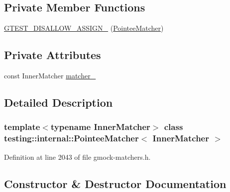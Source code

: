 \subsection*{Private Member Functions}
\begin{DoxyCompactItemize}
\item 
\hyperlink{classtesting_1_1internal_1_1PointeeMatcher_a9e564aa0569377a404edefb7b2ccdb16}{G\+T\+E\+S\+T\+\_\+\+D\+I\+S\+A\+L\+L\+O\+W\+\_\+\+A\+S\+S\+I\+G\+N\+\_\+} (\hyperlink{classtesting_1_1internal_1_1PointeeMatcher}{Pointee\+Matcher})
\end{DoxyCompactItemize}
\subsection*{Private Attributes}
\begin{DoxyCompactItemize}
\item 
const Inner\+Matcher \hyperlink{classtesting_1_1internal_1_1PointeeMatcher_aa429edbc73c0350807d9b0ffcc6ab922}{matcher\+\_\+}
\end{DoxyCompactItemize}


\subsection{Detailed Description}
\subsubsection*{template$<$typename Inner\+Matcher$>$\newline
class testing\+::internal\+::\+Pointee\+Matcher$<$ Inner\+Matcher $>$}



Definition at line 2043 of file gmock-\/matchers.\+h.



\subsection{Constructor \& Destructor Documentation}
\mbox{\label{classtesting_1_1internal_1_1PointeeMatcher_ad9f7d9dbd115c50811ce82ba27f1ba56}} 
